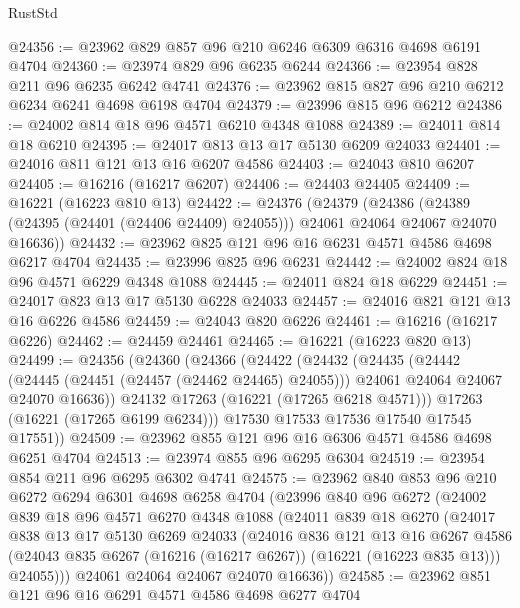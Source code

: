 \begin{lexlean}{RustStd}
\begin{coremodule}
@24356 := @23962 @829 @857 @96 @210 @6246 @6309 @6316 @4698 @6191 @4704
@24360 := @23974 @829 @96 @6235 @6244
@24366 := @23954 @828 @211 @96 @6235 @6242 @4741
@24376 := @23962 @815 @827 @96 @210 @6212 @6234 @6241 @4698 @6198 @4704
@24379 := @23996 @815 @96 @6212
@24386 := @24002 @814 @18 @96 @4571 @6210 @4348 @1088
@24389 := @24011 @814 @18 @6210
@24395 := @24017 @813 @13 @17 @5130 @6209 @24033
@24401 := @24016 @811 @121 @13 @16 @6207 @4586
@24403 := @24043 @810 @6207
@24405 := @16216 (@16217 @6207)
@24406 := @24403 @24405
@24409 := @16221 (@16223 @810 @13)
@24422 := @24376
    (@24379
      (@24386 (@24389 (@24395 (@24401 (@24406 @24409) @24055))) @24061 @24064 @24067 @24070 @16636))
@24432 := @23962 @825 @121 @96 @16 @6231 @4571 @4586 @4698 @6217 @4704
@24435 := @23996 @825 @96 @6231
@24442 := @24002 @824 @18 @96 @4571 @6229 @4348 @1088
@24445 := @24011 @824 @18 @6229
@24451 := @24017 @823 @13 @17 @5130 @6228 @24033
@24457 := @24016 @821 @121 @13 @16 @6226 @4586
@24459 := @24043 @820 @6226
@24461 := @16216 (@16217 @6226)
@24462 := @24459 @24461
@24465 := @16221 (@16223 @820 @13)
@24499 := @24356
    (@24360
      (@24366
        (@24422
          (@24432
            (@24435
              (@24442
                (@24445 (@24451 (@24457 (@24462 @24465) @24055)))
                @24061
                @24064
                @24067
                @24070
                @16636))
            @24132
            @17263
            (@16221 (@17265 @6218 @4571)))
          @17263
          (@16221 (@17265 @6199 @6234)))
        @17530
        @17533
        @17536
        @17540
        @17545
        @17551))
@24509 := @23962 @855 @121 @96 @16 @6306 @4571 @4586 @4698 @6251 @4704
@24513 := @23974 @855 @96 @6295 @6304
@24519 := @23954 @854 @211 @96 @6295 @6302 @4741
@24575 := @23962
    @840
    @853
    @96
    @210
    @6272
    @6294
    @6301
    @4698
    @6258
    @4704
    (@23996
      @840
      @96
      @6272
      (@24002
        @839
        @18
        @96
        @4571
        @6270
        @4348
        @1088
        (@24011
          @839
          @18
          @6270
          (@24017
            @838
            @13
            @17
            @5130
            @6269
            @24033
            (@24016
              @836
              @121
              @13
              @16
              @6267
              @4586
              (@24043 @835 @6267 (@16216 (@16217 @6267)) (@16221 (@16223 @835 @13)))
              @24055)))
        @24061
        @24064
        @24067
        @24070
        @16636))
@24585 := @23962 @851 @121 @96 @16 @6291 @4571 @4586 @4698 @6277 @4704

\end{coremodule}
\end{lexlean}
